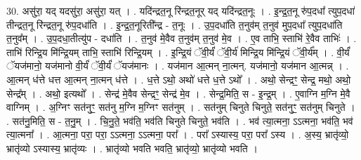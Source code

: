 \documentclass[17pt]{extarticle}
\begin{document}
30. असु॑रा॒ यद् यदसु॑रा॒ असु॑रा॒ यत् । . यदि॑न्द्रत॒नू रि॑न्द्रत॒नूर् यद् यदि॑न्द्रत॒नूः । . इ॒न्द्र॒त॒नू रु॑प॒दधा᳚ त्युप॒दधा॑ तीन्द्रत॒नू रि॑न्द्रत॒नू रु॑प॒दधा॑ति । . इ॒न्द्र॒त॒नूरिती᳚न्द्र - त॒नूः । . उ॒प॒दधा॑ति त॒नुव॑म् त॒नुव॑ मुप॒दधा᳚ त्युप॒दधा॑ति त॒नुव᳚म् । . उ॒प॒दधा॒तीत्यु॑प - दधा॑ति । . त॒नुव॑ मे॒वैव त॒नुव॑म् त॒नुव॑ मे॒व । . ए॒व ताभि॒ स्ताभि॑ रे॒वैव ताभिः॑ । . ताभि॑ रिन्द्रि॒य मि॑न्द्रि॒यम् ताभि॒ स्ताभि॑ रिन्द्रि॒यम् । . इ॒न्द्रि॒यं ॅवी॒र्यं॑ ॅवी॒र्य॑ मिन्द्रि॒य मि॑न्द्रि॒यं ॅवी॒र्य᳚म् । . वी॒र्यं॑ ॅयज॑मानो॒ यज॑मानो वी॒र्यं॑ ॅवी॒र्यं॑ ॅयज॑मानः । . यज॑मान आ॒त्मन् ना॒त्मन्. यज॑मानो॒ यज॑मान आ॒त्मन्न् । . आ॒त्मन् ध॑त्ते धत्त आ॒त्मन् ना॒त्मन् ध॑त्ते । . ध॒त्ते ऽथो॒ अथो॑ धत्ते ध॒त्ते ऽथो᳚ । . अथो॒ सेन्द्रꣳ॒॒ सेन्द्र॒ मथो॒ अथो॒ सेन्द्र᳚म् । . अथो॒ इत्यथो᳚ । . सेन्द्र॑ मे॒वैव सेन्द्रꣳ॒॒ सेन्द्र॑ मे॒व । . सेन्द्र॒मिति॒ स - इ॒न्द्र॒म् । . ए॒वाग्नि म॒ग्नि मे॒वै वाग्निम् । . अ॒ग्निꣳ सत॑नुꣳ॒॒ सत॑नु म॒ग्नि म॒ग्निꣳ सत॑नुम् । . सत॑नुम् चिनुते चिनुते॒ सत॑नुꣳ॒॒ सत॑नुम् चिनुते । . सत॑नु॒मिति॒ स - त॒नु॒म् । . चि॒नु॒ते॒ भव॑ति॒ भव॑ति चिनुते चिनुते॒ भव॑ति । . भव॑ त्या॒त्मना॒ ऽऽत्मना॒ भव॑ति॒ भव॑ त्या॒त्मना᳚ । . आ॒त्मना॒ परा॒ परा॒ ऽऽत्मना॒ ऽऽत्मना॒ परा᳚ । . परा᳚ ऽस्यास्य॒ परा॒ परा᳚ ऽस्य । . अ॒स्य॒ भ्रातृ॑व्यो॒ भ्रातृ॑व्यो ऽस्यास्य॒ भ्रातृ॑व्यः । . भ्रातृ॑व्यो भवति भवति॒ भ्रातृ॑व्यो॒ भ्रातृ॑व्यो भवति । \newline
\end{document}

